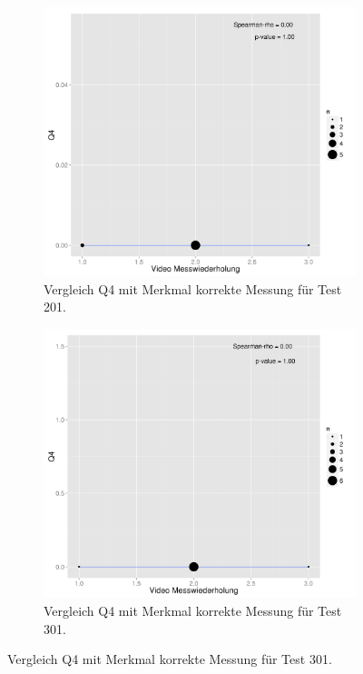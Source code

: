 \begin{figure}[htp]
   \begin{subfigure}{0.32\textwidth}
       \includegraphics[width=1.0\linewidth]{graphics/corVideoQ4201.png}
       \caption{Vergleich Q4 mit Merkmal korrekte Messung für Test 201.}
       \label{fig:corVideoQ4201}
     \end{subfigure}
     \begin{subfigure}{0.32\textwidth}
       \includegraphics[width=1.0\linewidth]{graphics/corVideoQ4301.png}
       \caption{Vergleich Q4 mit Merkmal korrekte Messung für Test 301.}

\end{subfigure}
\end{figure}
